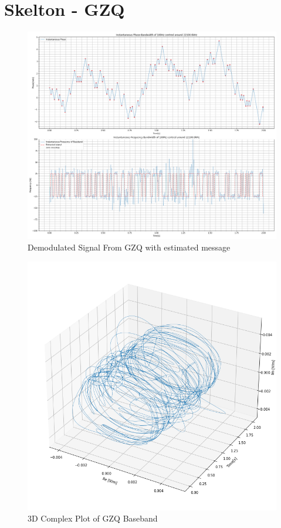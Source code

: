 \section{Skelton - GZQ}

\begin{figure}[H]
    \centering
    \includegraphics[width = \textwidth]{figs/AppA/GZQ.png}
    \caption{Demodulated Signal From GZQ with estimated message}
    \label{fig:my_label}
\end{figure}
\begin{figure}[H]
    \centering
    \includegraphics[width = \textwidth]{figs/AppA/gzq3D.png}
    \caption{3D Complex Plot of GZQ Baseband}
    \label{fig:my_label}
\end{figure}

